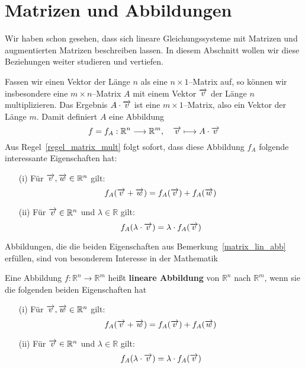 \section{Matrizen  und Abbildungen}\label{section_lin_abb}


\setcounter{definition}{0}
\setcounter{beispiel}{0}
\setcounter{notiz}{0}

Wir haben schon gesehen, dass sich lineare Gleichungssysteme mit Matrizen und 
augmentierten Matrizen beschreiben lassen. In diesem Abschnitt wollen wir diese 
Beziehungen weiter studieren und vertiefen.

\begin{notiz}\label{matrix_lin_abb} 
Fassen wir einen Vektor der Länge $n$ als eine $n \times 1$--Matrix auf, so können wir 
insbesondere eine $m \times n$--Matrix $A$ mit einem Vektor $\overrightarrow{v}$ der Länge $n$ 
multiplizieren. Das Ergebnis $A \cdot \overrightarrow{v}$ ist eine $m \times 1$--Matrix, also ein 
Vektor der Länge $m$. Damit definiert $A$ eine Abbildung
  	$$ f = f_A : \mathbb R^n \longrightarrow \mathbb R^m, \quad \overrightarrow{v} \longmapsto 
 	A \cdot \overrightarrow{v} $$
Aus Regel~\ref{regel_matrix_mult} folgt sofort, dass diese Abbildung $f_A$ folgende interessante 
Eigenschaften hat:
\begin{itemize} 
\item[(i)] Für $\overrightarrow{v}, \overrightarrow{w} \in \mathbb R^n$ gilt:
  	$$ f_A(\overrightarrow{v} + \overrightarrow{w}) = f_A(\overrightarrow{v}) + f_A(\overrightarrow{w}) $$
\item[(ii)] Für $\overrightarrow{v} \in \mathbb R^n$ und $\lambda \in \mathbb R$ gilt:
  	$$ f_A( \lambda \cdot \overrightarrow{v}) = \lambda \cdot f_A(\overrightarrow{v}) $$
\end{itemize}
\end{notiz}

Abbildungen, die die beiden Eigenschaften aus Bemerkung~\ref{matrix_lin_abb} erfüllen, sind von 
besonderem Interesse in der Mathematik

\begin{definition}\label{lineare_abbildung}
Eine Abbildung $f: \mathbb R^n \longrightarrow \mathbb R^m$  heißt 
\textbf{lineare Abbildung} von $\mathbb R^n$ nach $\mathbb R^m$, wenn 
sie die folgenden beiden Eigenschaften hat 
\begin{itemize} 
\item[(i)] Für $\overrightarrow{v}, \overrightarrow{w} \in \mathbb R^n$ gilt:
  	$$ f_A(\overrightarrow{v} + \overrightarrow{w}) = f_A(\overrightarrow{v}) + f_A(\overrightarrow{w}) $$
\item[(ii)] Für $\overrightarrow{v} \in \mathbb R^n$ und $\lambda \in \mathbb R$ gilt:
  	$$ f_A( \lambda \cdot \overrightarrow{v}) = \lambda \cdot f_A(\overrightarrow{v}) $$
\end{itemize}
\end{definition}

